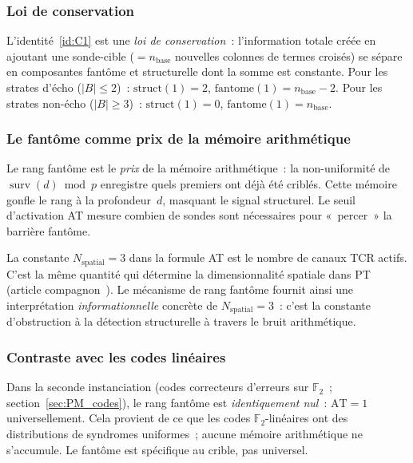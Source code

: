 \documentclass[12pt,a4paper]{article}
\begin{document}
\subsubsection{Loi de conservation}

L'identité~\ref{id:C1} est une \emph{loi de conservation}~:
l'information totale créée en ajoutant une sonde-cible
($= n_{\mathrm{base}}$ nouvelles colonnes de termes croisés) se
sépare en composantes fantôme et structurelle dont la somme est
constante. Pour les strates d'écho ($|B| \le 2$)~:
$\mathrm{struct}(1) = 2$,
$\mathrm{fantome}(1) = n_{\mathrm{base}} - 2$. Pour les strates
non-écho ($|B| \ge 3$)~: $\mathrm{struct}(1) = 0$,
$\mathrm{fantome}(1) = n_{\mathrm{base}}$.

\subsubsection{Le fantôme comme prix de la mémoire arithmétique}

Le rang fantôme est le \emph{prix} de la mémoire arithmétique~: la
non-uniformité de $\operatorname{surv}(d) \bmod p$ enregistre quels
premiers ont déjà été criblés. Cette mémoire gonfle le rang à la
profondeur~$d$, masquant le signal structurel. Le seuil
d'activation AT mesure combien de sondes sont nécessaires pour
«~percer~» la barrière fantôme.

La constante $N_{\mathrm{spatial}} = 3$ dans la formule AT est le
nombre de canaux TCR actifs. C'est la même quantité qui détermine
la dimensionnalité spatiale dans PT (article
compagnon~\cite{companion_M3}). Le mécanisme de rang fantôme fournit
ainsi une interprétation \emph{informationnelle} concrète de
$N_{\mathrm{spatial}} = 3$~: c'est la constante d'obstruction à la
détection structurelle à travers le bruit arithmétique.

\subsubsection{Contraste avec les codes linéaires}

Dans la seconde instanciation (codes correcteurs d'erreurs sur
$\mathbb{F}_2$~; section~\ref{sec:PM_codes}), le rang fantôme est
\emph{identiquement nul}~: $\mathrm{AT} = 1$ universellement. Cela
provient de ce que les codes $\mathbb{F}_2$-linéaires ont des
distributions de syndromes uniformes~; aucune mémoire arithmétique
ne s'accumule. Le fantôme est spécifique au crible, pas universel.


\end{document}
